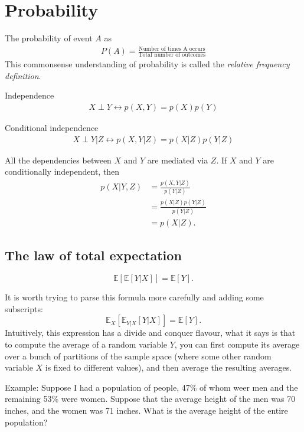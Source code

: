 \section{Probability}
\label{sec:intro_prob}

The probability of event $A$ as
\begin{align*}
	P(A) = \frac{\text{Number of times A occurs}}{\text{Total number of outcomes}}
\end{align*}
This commonsense understanding of probability is called the \textit{relative frequency definition}.

\begin{definition}{Independence}
	\begin{align*}
		X\perp Y \leftrightarrow p(X,Y)=p(X)p(Y)
	\end{align*}
\end{definition}
\begin{definition}{Conditional independence}
	\begin{align*}
		X\perp Y|Z \leftrightarrow p(X,Y|Z)=p(X|Z)p(Y|Z)
	\end{align*}
\end{definition}
All the dependencies between $X$ and $Y$ are mediated via $Z$. If $X$ and $Y$ are conditionally independent, then 
\begin{align*}
	p(X|Y,Z)&=\frac{p(X,Y|Z)}{p(Y|Z)}\\
	&=\frac{p(X|Z)p(Y|Z)}{p(Y|Z)}\\
	&=p(X|Z).
\end{align*}


\subsection{The law of total expectation}
$$\mathbb{E}[\mathbb{E}[Y|X]] = \mathbb{E}[Y].$$

It is worth trying to parse this formula more carefully and adding some subscripts:
$$\mathbb{E}_X[\mathbb{E}_{Y|X}[Y|X]] = \mathbb{E}[Y].$$
Intuitively, this expression has a divide and conquer flavour, \ie what it says is that to compute the average of a random variable $Y$, you can first compute its average over a bunch of partitions of the sample space (where some other random variable $X$ is fixed to different values), and then average the resulting averages. 

Example: Suppose I had a population of people, 47\% of whom weer men and the remaining 53\% were women. Suppose that the average height of the men was 70 inches, and the women was 71 inches. What is the average height of the entire population?

